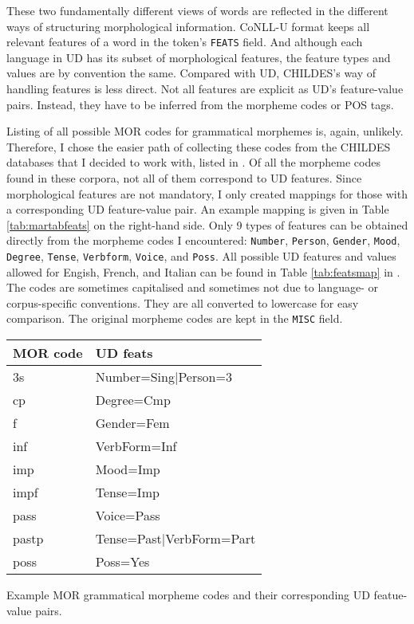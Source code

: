 These two fundamentally different views of words are reflected in the different ways of structuring morphological information. CoNLL-U format keeps all relevant features of a word in the token's \texttt{FEATS} field. And although each language in UD has its subset of morphological features, the feature types and values are by convention the same. Compared with UD, CHILDES's way of handling features is less direct. Not all features are explicit as UD's feature-value pairs. Instead, they have to be inferred from the morpheme codes or POS tags.

Listing of all possible MOR codes for grammatical morphemes is, again, unlikely. Therefore, I chose the easier path of collecting these codes from the CHILDES databases that I decided to work with, listed in . Of all the morpheme codes found in these corpora, not all of them correspond to UD features. Since morphological features are not mandatory, I only created mappings for those with a corresponding UD feature-value pair. An example mapping is given in Table \ref{tab:martabfeats} on the right-hand side. Only 9 types of features can be obtained directly from the morpheme codes I encountered: \texttt{Number}, \texttt{Person}, \texttt{Gender}, \texttt{Mood}, \texttt{Degree}, \texttt{Tense}, \texttt{Verbform}, \texttt{Voice}, and \texttt{Poss}. All possible UD features and values allowed for Engish, French, and Italian can be found in Table \ref{tab:featsmap} in . The codes are sometimes capitalised and sometimes not due to language- or corpus-specific conventions. They are all converted to lowercase for easy comparison. The original morpheme codes are kept in the \texttt{MISC} field.
\begin{margintable}[1\baselineskip]
\begin{tabularx}{1\textwidth}{@{}ll@{}}
\toprule
\textbf{MOR code} & \textbf{UD feats}\\ \midrule
    3s & Number=Sing|Person=3\\
    cp & Degree=Cmp\\
    f & Gender=Fem\\
    inf & VerbForm=Inf\\
    imp & Mood=Imp\\
    impf & Tense=Imp\\
    pass & Voice=Pass\\
    pastp & Tense=Past|VerbForm=Part\\
    poss & Poss=Yes\\\bottomrule
\end{tabularx}
\caption{\label{tab:martabfeats}Example MOR grammatical morpheme codes and their corresponding UD featue-value pairs.}
\footnotesize
\end{margintable}


